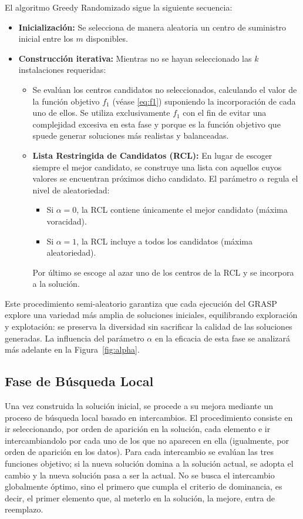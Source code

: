 \documentclass[12pt,a4paper]{book}
\begin{document}
El algoritmo Greedy Randomizado sigue la siguiente secuencia:  

\begin{itemize}
    \item \textbf{Inicialización:} Se selecciona de manera aleatoria un centro de suministro inicial entre los $m$ disponibles.
    \item \textbf{Construcción iterativa:} Mientras no se hayan seleccionado las $k$ instalaciones requeridas:
    \begin{itemize}
        \item Se evalúan los centros candidatos no seleccionados, calculando el valor de la función objetivo $f_1$ (véase \ref{eq:f1}) suponiendo la incorporación de cada uno de ellos. Se utiliza exclusivamente $f_1$ con el fin de evitar una complejidad excesiva en esta fase y porque es la función objetivo que spuede generar soluciones más realistas y balanceadas.
        \item \textbf{Lista Restringida de Candidatos (RCL):} En lugar de escoger siempre el mejor candidato, se construye una lista con aquellos cuyos valores se encuentran próximos dicho candidato. El parámetro $\alpha$ regula el nivel de aleatoriedad:
        \begin{itemize}
            \item Si $\alpha = 0$, la RCL contiene únicamente el mejor candidato (máxima voracidad).
            \item Si $\alpha = 1$, la RCL incluye a todos los candidatos (máxima aleatoriedad).
        \end{itemize}
        Por último se escoge al azar uno de los centros de la RCL y se incorpora a la solución.
    \end{itemize}
\end{itemize}

Este procedimiento semi-aleatorio garantiza que cada ejecución del GRASP explore una variedad más amplia de soluciones iniciales, equilibrando exploración y explotación: se preserva la diversidad sin sacrificar la calidad de las soluciones generadas. La influencia del parámetro $\alpha$ en la eficacia de esta fase se analizará más adelante en la Figura~\ref{fig:alpha}.

\subsection{Fase de Búsqueda Local}
Una vez construida la solución inicial, se procede a su mejora mediante un proceso de búsqueda local basado en intercambios. El procedimiento consiste en ir seleccionando, por orden de aparición en la solución, cada elemento e ir intercambiandolo por cada uno de los que no aparecen en ella (igualmente, por orden de aparición en los datos). Para cada intercambio se evalúan las tres funciones objetivo; si la nueva solución domina a la solución actual, se adopta el cambio y la nueva solución pasa a ser la actual. No se busca el intercambio globalmente óptimo, sino el primero que cumpla el criterio de dominancia, es decir, el primer elemento que, al meterlo en la solución, la mejore, entra de reemplazo. 
\end{document}

